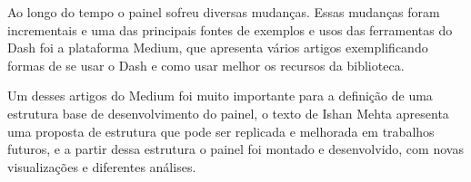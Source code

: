 Ao longo do tempo o painel sofreu diversas mudanças. Essas mudanças foram incrementais e uma das principais fontes de exemplos e usos das ferramentas do Dash foi a plataforma Medium, que apresenta vários artigos exemplificando formas de se usar o Dash e como usar melhor os recursos da biblioteca.

Um desses artigos do Medium foi muito importante para a definição de uma estrutura base de desenvolvimento do painel, o texto de Ishan Mehta \cite{medium1} apresenta uma proposta de estrutura que pode ser replicada e melhorada em trabalhos futuros, e a partir dessa estrutura o painel foi montado e desenvolvido, com novas visualizações e diferentes análises.

